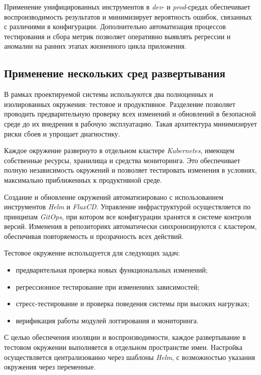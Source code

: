 Применение унифицированных инструментов в \textit{dev}- и \textit{prod}-средах обеспечивает воспроизводимость результатов и минимизирует вероятность ошибок, связанных с различиями в конфигурации. Дополнительно автоматизация процессов тестирования и сбора метрик позволяет оперативно выявлять регрессии и аномалии на ранних этапах жизненного цикла приложения.

\subsection{Применение нескольких сред развертывания}

В рамках проектируемой системы используются два полноценных и изолированных окружения: тестовое и продуктивное. Разделение позволяет проводить предварительную проверку всех изменений и обновлений в безопасной среде до их внедрения в рабочую эксплуатацию. Такая архитектура минимизирует риски сбоев и упрощает диагностику.

Каждое окружение развернуто в отдельном кластере \textit{Kubernetes}, имеющем собственные ресурсы, хранилища и средства мониторинга. Это обеспечивает полную независимость окружений и позволяет тестировать изменения в условиях, максимально приближенных к продуктивной среде.

Создание и обновление окружений автоматизировано с использованием инструментов \textit{Helm} и \textit{FluxCD}. Управление инфраструктурой осуществляется по принципам \textit{GitOps}, при котором все конфигурации хранятся в системе контроля версий. Изменения в репозиториях автоматически синхронизируются с кластером, обеспечивая повторяемость и прозрачность всех действий.

Тестовое окружение испольщуется для следующих задач:
\begin{itemize}
    \item предварительная проверка новых функциональных изменений;
    \item регрессионное тестирование при изменениих зависимостей;
    \item стресс-тестирование и проверка поведения системы при высоких нагрузках;
    \item верификация работы модулей логгирования и мониторинга.
\end{itemize}

С целью обеспечения изоляции и воспроизводимости, каждое развертывание в тестовом окружении выполняется в отдельном пространстве имен. Настройка осуществляется централизованно через шаблоны \textit{Helm}, с возможностью указания окружения через переменные.


